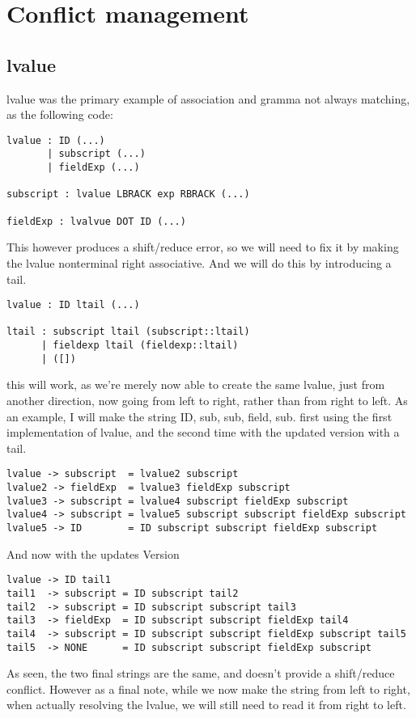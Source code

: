 \documentclass{article}
\begin{document}
\section{Conflict management}

\subsection{lvalue}
lvalue was the primary example of association and gramma not always matching, as the following code:
\begin{lstlisting}[frame=single]
lvalue : ID (...)
	   | subscript (...)
	   | fieldExp (...)

subscript : lvalue LBRACK exp RBRACK (...)

fieldExp : lvalvue DOT ID (...)

\end{lstlisting}

This however produces a shift/reduce error, so we will need to fix it by making the lvalue nonterminal right associative. And we will do this by introducing a tail.

\begin{lstlisting}[frame=single]
lvalue : ID ltail (...)

ltail : subscript ltail (subscript::ltail)
      | fieldexp ltail (fieldexp::ltail)
      | ([])
\end{lstlisting}

this will work, as we're merely now able to create the same lvalue, just from another direction, now going from left to right, rather than from right to left.
As an example, I will make the string ID, sub, sub, field, sub. first using the first implementation of lvalue, and the second time with the updated version with a tail.

\begin{lstlisting}[frame=single]
lvalue -> subscript  = lvalue2 subscript
lvalue2 -> fieldExp  = lvalue3 fieldExp subscript
lvalue3 -> subscript = lvalue4 subscript fieldExp subscript
lvalue4 -> subscript = lvalue5 subscript subscript fieldExp subscript
lvalue5 -> ID        = ID subscript subscript fieldExp subscript
\end{lstlisting}
And now with the updates Version
\begin{lstlisting}[frame=single]
lvalue -> ID tail1
tail1  -> subscript = ID subscript tail2
tail2  -> subscript = ID subscript subscript tail3
tail3  -> fieldExp  = ID subscript subscript fieldExp tail4
tail4  -> subscript = ID subscript subscript fieldExp subscript tail5
tail5  -> NONE      = ID subscript subscript fieldExp subscript
\end{lstlisting}
As seen, the two final strings are the same, and doesn't provide a shift/reduce conflict. However as a final note, while we now make the string from left to right, when actually resolving the lvalue, we will still need to read it from right to left.
\end{document}
